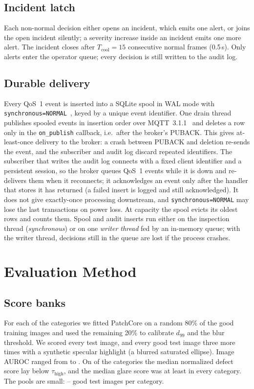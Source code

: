 \documentclass[conference]{IEEEtran}
\begin{document}
\subsection{Incident latch}
Each non-normal decision either opens an incident, which emits one alert, or joins the open incident silently; a severity increase inside an incident emits one more alert. The incident closes after $T_{\text{cool}}=15$ consecutive normal frames (0.5\,s). Only alerts enter the operator queue; every decision is still written to the audit log.

\subsection{Durable delivery}
Every QoS~1 event is inserted into a SQLite spool in WAL mode with \texttt{synchronous=NORMAL}~\cite{sqlitewal}, keyed by a unique event identifier. One drain thread publishes spooled events in insertion order over MQTT~3.1.1~\cite{mqtt311} and deletes a row only in the \texttt{on\_publish} callback, i.e.\ after the broker's PUBACK. This gives at-least-once delivery to the broker: a crash between PUBACK and deletion re-sends the event, and the subscriber and audit log discard repeated identifiers. The subscriber that writes the audit log connects with a fixed client identifier and a persistent session, so the broker queues QoS~1 events while it is down and re-delivers them when it reconnects; it acknowledges an event only after the handler that stores it has returned (a failed insert is logged and still acknowledged). It does not give exactly-once processing downstream, and \texttt{synchronous=NORMAL} may lose the last transactions on power loss. At capacity the spool evicts its oldest rows and counts them. Spool and audit inserts run either on the inspection thread (\emph{synchronous}) or on one \emph{writer thread} fed by an in-memory queue; with the writer thread, decisions still in the queue are lost if the process crashes.

\section{Evaluation Method}
\subsection{Score banks}
For each of the \NumCategories{} categories we fitted PatchCore on a random 80\% of the good training images and used the remaining 20\% to calibrate $d_{99}$ and the blur threshold. We scored every test image, and every good test image three more times with a synthetic specular highlight (a blurred saturated ellipse). Image AUROC ranged from \BankAurocMin{} to \BankAurocMax{}. On \DefectMedianBelowHigh{} of the \NumCategories{} categories the median normalized defect score lay below $\tau_{\text{high}}$, and the median glare score was at least \GlareMedianMin{} in every category. The pools are small: \GoodPoolMin{}--\GoodPoolMax{} good test images per category.
\end{document}
